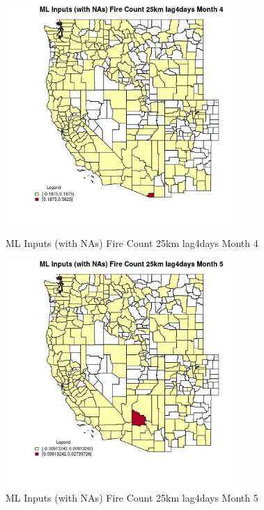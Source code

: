 \begin{figure} 
\centering  
\includegraphics[width=0.77\textwidth]{Code_Outputs/Report_ML_input_PM25_Step4_part_e_de_duplicated_aves_compiled_2019-05-21wNAs_CountyFire_Count_25km_lag4daysmedianMonth4.jpg} 
\caption{\label{fig:Report_ML_input_PM25_Step4_part_e_de_duplicated_aves_compiled_2019-05-21wNAsCountyFire_Count_25km_lag4daysmedianMonth4}ML Inputs (with NAs) Fire Count 25km lag4days Month 4} 
\end{figure} 
 

\begin{figure} 
\centering  
\includegraphics[width=0.77\textwidth]{Code_Outputs/Report_ML_input_PM25_Step4_part_e_de_duplicated_aves_compiled_2019-05-21wNAs_CountyFire_Count_25km_lag4daysmedianMonth5.jpg} 
\caption{\label{fig:Report_ML_input_PM25_Step4_part_e_de_duplicated_aves_compiled_2019-05-21wNAsCountyFire_Count_25km_lag4daysmedianMonth5}ML Inputs (with NAs) Fire Count 25km lag4days Month 5} 
\end{figure} 
 

